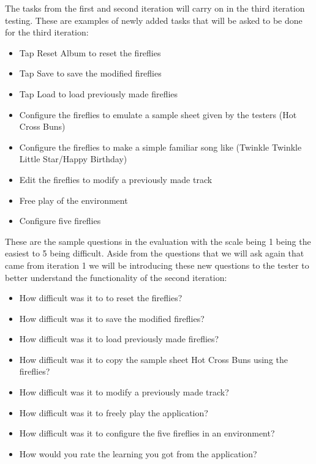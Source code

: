 The tasks from the first and second iteration will carry on in the third iteration testing. These are examples of newly added tasks that will be asked to be done for the third iteration:
\begin{itemize}
    \item Tap Reset Album to reset the fireflies
    \item Tap Save to save the modified fireflies
    \item Tap Load to load previously made fireflies
    \item Configure the fireflies to emulate a sample sheet given by the testers (Hot Cross Buns)
    \item Configure the fireflies to make a simple familiar song like (Twinkle Twinkle Little Star/Happy Birthday)
    \item Edit the fireflies to modify a previously made track
    \item Free play of the environment
    \item Configure five fireflies
\end{itemize}

These are the sample questions in the evaluation with the scale being 1 being the easiest to 5 being difficult. Aside from the questions that we will ask again that came from iteration 1 we will be introducing these new questions to the tester to better understand the functionality of the second iteration:

\begin{itemize}
    \item How difficult was it to to reset the fireflies?
    \item How difficult was it to save the modified fireflies?
    \item How difficult was it to load previously made fireflies?
    \item How difficult was it to copy the sample sheet Hot Cross Buns using the fireflies? 
    \item How difficult was it to modify a previously made track? 
    \item How difficult was it to freely play the application?
    \item How difficult was it to configure the five fireflies in an environment?
    \item How would you rate the learning you got from the application?
\end{itemize}


